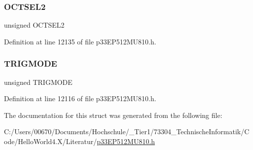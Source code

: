 \subsubsection{\texorpdfstring{O\+C\+T\+S\+E\+L2}{OCTSEL2}}
{\footnotesize\ttfamily unsigned O\+C\+T\+S\+E\+L2}



Definition at line 12135 of file p33\+E\+P512\+M\+U810.\+h.

\mbox{\label{structtag_o_c15_c_o_n1_b_i_t_s_a7a0057e0dca6e2663584b5b9e1da04c3}} 
\subsubsection{\texorpdfstring{T\+R\+I\+G\+M\+O\+DE}{TRIGMODE}}
{\footnotesize\ttfamily unsigned T\+R\+I\+G\+M\+O\+DE}



Definition at line 12116 of file p33\+E\+P512\+M\+U810.\+h.



The documentation for this struct was generated from the following file\+:\begin{DoxyCompactItemize}
\item 
C\+:/\+Users/00670/\+Documents/\+Hochschule/\+\_\+\+Tier1/73304\+\_\+\+Technische\+Informatik/\+Code/\+Hello\+World4.\+X/\+Literatur/\hyperlink{p33_e_p512_m_u810_8h}{p33\+E\+P512\+M\+U810.\+h}\end{DoxyCompactItemize}
